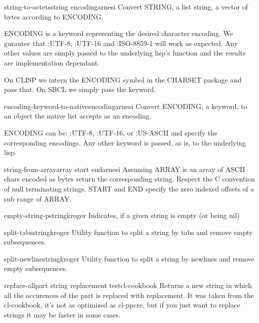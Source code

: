 \begin{function}{string-to-octets}{string encoding}{arnesi}{}
  Convert STRING, a list string, a vector of bytes according to ENCODING.

ENCODING is a keyword representing the desired character
encoding. We gurantee that :UTF-8, :UTF-16 and :ISO-8859-1 will
work as expected. Any other values are simply passed to the
underlying lisp's function and the results are implementation
dependant.

On CLISP we intern the ENCODING symbol in the CHARSET package and
pass that. On SBCL we simply pass the keyword.
\end{function}

\begin{function}{encoding-keyword-to-native}{encoding}{arnesi}{}
  Convert ENCODING, a keyword, to an object the native list
accepts as an encoding.

ENCODING can be: :UTF-8, :UTF-16, or :US-ASCII and specify the
corresponding encodings. Any other keyword is passed, as is, to
the underlying lisp.
\end{function}

\begin{function}{string-from-array}{array \key start end}{arnesi}{}
  Assuming ARRAY is an array of ASCII chars encoded as bytes return
the corresponding string. Respect the C convention of null terminating
strings. START and END specify the zero indexed offsets of a sub range
of ARRAY.
\end{function}

\begin{function}{empty-string-p}{string}{kroger}{}
  Indicates, if a given string is empty (or being nil)
\end{function}

\begin{function}{split-tabs}{string}{kroger}{}
  Utility function to split a string by tabs and remove empty
  subsequences.
\end{function}

\begin{function}{split-newline}{string}{kroger}{}
  Utility function to split a string by newlines and remove empty
  subsequences.
\end{function}

\begin{function}{replace-all}{part string replacement \key test}{cl-cookbook}{}
  Returns a new string in which all the occurences of the part is
  replaced with replacement. It was taken from the cl-cookbook, it's
  not as optimized as cl-ppcre, but if you just want to replace
  strings it may be faster in some cases.
\end{function}
